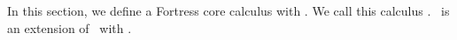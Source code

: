 %
%
%
%

\newpage
\section{\wherecore}


In this section, we define a Fortress core calculus with \wc.
We call this calculus \emph{\wherecore}.
\wherecore\ is an extension of \basiccore\ with \wc.





